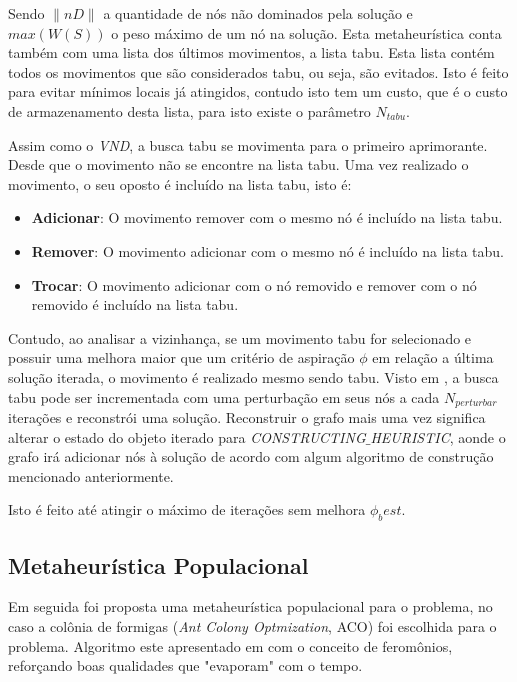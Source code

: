 \documentclass[conference,compsoc]{IEEEtran}
\begin{document}
Sendo $\| nD \|$ a quantidade de nós não dominados pela solução e $max(W(S))$ o peso máximo de um nó na solução. Esta metaheurística conta também com uma lista dos últimos movimentos, a lista tabu. Esta lista contém todos os movimentos que são considerados tabu, ou seja, são evitados. Isto é feito para evitar mínimos locais já atingidos, contudo isto tem um custo, que é o custo de armazenamento desta lista, para isto existe o parâmetro $N_{tabu}$.

Assim como o \textit{VND}, a busca tabu se movimenta para o primeiro aprimorante. Desde que o movimento não se encontre na lista tabu. Uma vez realizado o movimento, o seu oposto é incluído na lista tabu, isto é:

\begin{itemize}
    \item \textbf{Adicionar}: O movimento remover com o mesmo nó é incluído na lista tabu.
    
    \item \textbf{Remover}: O movimento adicionar com o mesmo nó é incluído na lista tabu.
    
    \item \textbf{Trocar}: O movimento adicionar com o nó removido e remover com o nó removido é incluído na lista tabu.
\end{itemize}

Contudo, ao analisar a vizinhança, se um movimento tabu for selecionado e possuir uma melhora maior que um critério de aspiração $\phi$ em relação a última solução iterada, o movimento é realizado mesmo sendo tabu. Visto em \cite{Mayra}, a busca tabu pode ser incrementada com uma perturbação em seus nós a cada $N_{perturbar}$ iterações e reconstrói uma solução. Reconstruir o grafo mais uma vez significa alterar o estado do objeto iterado para \textit{CONSTRUCTING$\_$HEURISTIC}, aonde o grafo irá adicionar nós à solução de acordo com algum algoritmo de construção mencionado anteriormente.

Isto é feito até atingir o máximo de iterações sem melhora $\phi_best$.

\subsection{Metaheurística Populacional}

Em seguida foi proposta uma metaheurística populacional para o problema, no caso a colônia de formigas (\textit{Ant Colony Optmization}, ACO) foi escolhida para o problema. Algoritmo este apresentado em \cite{Jovanovic} com o conceito de feromônios, reforçando boas qualidades que "evaporam" com o tempo.
\end{document}
